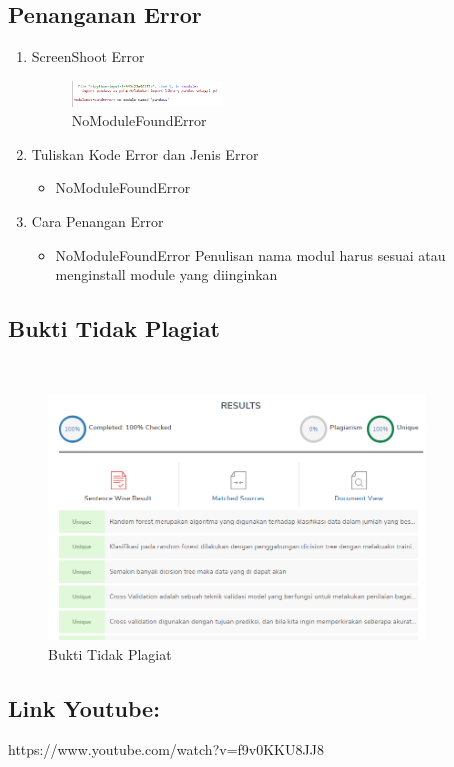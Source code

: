 \subsection{Penanganan Error}
\begin{enumerate}
	\item ScreenShoot Error
	\begin{figure}[H]
		\includegraphics[width=4cm]{figures/1174087/3/error.png}
		\centering
		\caption{NoModuleFoundError}
	\end{figure}
	\item Tuliskan Kode Error dan Jenis Error
	\begin{itemize}
		\item NoModuleFoundError
	\end{itemize}
	\item Cara Penangan Error
	\begin{itemize}
		\item NoModuleFoundError
		\hfill\break
		Penulisan nama modul harus sesuai atau menginstall module yang diinginkan
	\end{itemize}
\end{enumerate}


\subsection{Bukti Tidak Plagiat}
\hfill\\
\begin{figure}[H]
\centerline{\includegraphics[width=10cm]{figures/1174087/3/plagiat.png}}
\caption{Bukti Tidak Plagiat}
\label{labelgambar}
\end{figure}

\subsection{Link Youtube:}
https://www.youtube.com/watch?v=f9v0KKU8JJ8